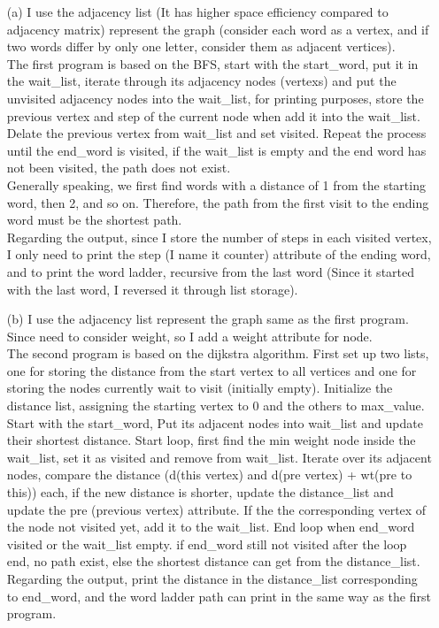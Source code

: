 \documentclass[11pt]{article}
\begin{document}
\begin{itemize}
\item[(a)] 
I use the adjacency list (It has higher space efficiency compared to adjacency matrix) represent the graph (consider each word as a vertex, and if two words differ 
by only one letter, consider them as adjacent vertices). \\The first program is based on the BFS, start with the start_word, put it in the wait_list, iterate through 
its adjacency nodes (vertexs) and put the unvisited adjacency nodes into the wait_list, for printing purposes, store the previous vertex and step of the current 
node when add it into the wait_list. Delate the previous vertex from wait_list and set visited. Repeat the process until the end_word is visited, if the wait_list is 
empty and the end word has not been visited, the path does not exist.\\ Generally speaking, we first find words with a distance of 1 from the starting word, then 2, 
and so on. Therefore, the path from the first visit to the ending word must be the shortest path. \\Regarding the output, since I store the number of steps in each visited 
vertex, I only need to print the step (I name it counter) attribute of the ending word, and to print the word ladder, recursive from the last word (Since it started with 
the last word, I reversed it through list storage).
\item[(b)]
I use the adjacency list represent the graph same as the first program. Since need to consider weight, so I add a weight attribute for node.\\The second program is based on 
the dijkstra algorithm. First set up two lists, one for storing the distance from the start vertex to all vertices and one for storing the nodes currently wait to visit 
(initially empty). Initialize the distance list, assigning the starting vertex to 0 and the others to max_value. Start with the start_word, Put its adjacent nodes into 
wait_list and update their shortest distance. Start loop, first find the min weight node inside the wait_list, set it as visited and remove from wait_list. Iterate over its 
adjacent nodes, compare the distance (d(this vertex) and d(pre vertex) + wt(pre to this)) each, if the new distance is shorter, update the distance_list and update the pre 
(previous vertex) attribute. If the the corresponding vertex of the node not visited yet, add it to the wait_list. End loop when end_word visited or the wait_list empty.
if end_word still not visited after the loop end, no path exist, else the shortest distance can get from the distance_list.\\Regarding the output, print the distance in the 
distance_list corresponding to end_word, and the word ladder path can print in the same way as the first program.

\end{itemize} 
\end{document}
